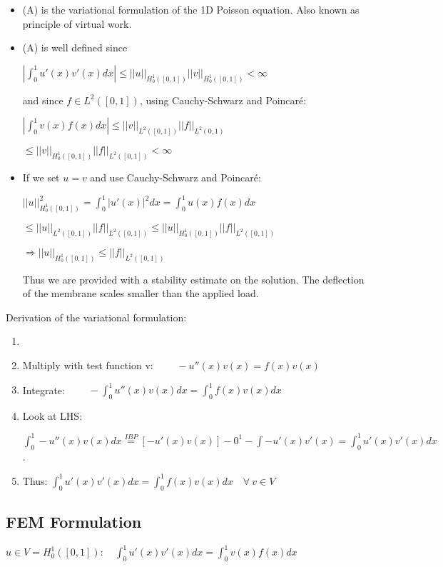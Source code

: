 \documentclass[10pt,a4paper]{scrartcl}
\begin{document}
\begin{multicols*}{3}
{\begin{itemize}
\ncompaq
\item (A) is the variational formulation of the 1D Poisson equation. Also known as principle of virtual work.
\item (A) is well defined since

$\left|\int_0^1u'(x)v'(x)dx\right|\leq||u||_{H_0^1([0,1])}||v||_{H_0^1([0,1])}<\infty$

and since $f\in L^2([0,1])$, using Cauchy-Schwarz and Poincaré:

$\left|\int_0^1v(x)f(x)dx\right|\leq ||v||_{L^2([0,1])}||f||_{L^2({0,1})}$

$\leq||v||_{H_0^1([0,1])}||f||_{L^2([0,1])}<\infty$
\item If we set $u=v$ and use Cauchy-Schwarz and Poincaré:

$||u||_{H_0^1([0,1])}^2=\int_0^1|u'(x)|^2dx=\int_0^1u(x)f(x)dx$

$\leq||u||_{L^2([0,1])}||f||_{L^2([0,1])}\leq||u||_{H_0^1([0,1])}||f||_{L^2([0,1])}$

$\Rightarrow ||u||_{H_0^1([0,1])}\leq||f||_{L^2([0,1])}$

Thus we are provided with a stability estimate on the solution. The deflection of the membrane scales smaller than the applied load.
\end{itemize}


Derivation of the variational formulation:

\begin{enumerate}
\ncompaq
\item {}
\item Multiply with test function v: $\qquad -u''(x)v(x)=f(x)v(x)$
\item Integrate: $\qquad -\int_0^1 u''(x)v(x)dx=\int_0^1 f(x)v(x)dx$
\item Look at LHS: 

$\int_0^1-u''(x)v(x) dx\overset{IBP}{=}[-u'(x)v(x)]-0^1-\int-u'(x)v'(x)=\int_0^1 u'(x)v'(x) dx$.
\item Thus: $\int_0^1 u'(x)v'(x) dx = \int_0^1 f(x)v(x) dx \quad \forall \ v\in V$
\end{enumerate}
}

\subsection{FEM Formulation}

$u\in V = H_0^1([0,1]):\quad \int_0^1u'(x)v'(x)dx=\int_0^1v(x)f(x)dx$


\end{multicols*}
\end{document}

